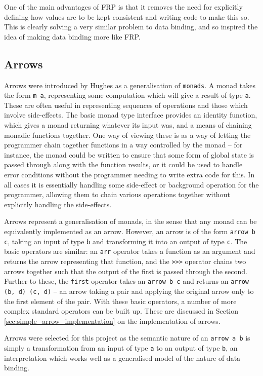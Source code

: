 \documentclass[12pt,twoside,notitlepage]{report}
\begin{document}
One of the main advantages of FRP is that it removes the need for explicitly defining how values are to be kept consistent and writing code to make this so. This is clearly solving a very similar problem to data binding, and so inspired the idea of making data binding more like FRP.

\subsection{Arrows}

Arrows were introduced by Hughes as a generalisation of \texttt{monads}. A monad takes the form \texttt{m a}, representing some computation which will give a result of type \texttt{a}. These are often useful in representing sequences of operations and those which involve side-effects. The basic monad type interface provides an identity function, which gives a monad returning whatever its input was, and a means of chaining monadic functions together. One way of viewing these is as a way of letting the programmer chain together functions in a way controlled by the monad -- for instance, the monad could be written to ensure that some form of global state is passed through along with the function results, or it could be used to handle error conditions without the programmer needing to write extra code for this. In all cases it is essentially handling some side-effect or background operation for the programmer, allowing them to chain various operations together without explicitly handling the side-effects.

Arrows represent a generalisation of monads, in the sense that any monad can be equivalently implemented as an arrow. However, an arrow is of the form \texttt{arrow b c}, taking an input of type \texttt{b} and transforming it into an output of type \texttt{c}. The basic operators are similar: an \texttt{arr} operator takes a function as an argument and returns the arrow representing that function, and the \texttt{>>>} operator chains two arrows together such that the output of the first is passed through the second. Further to these, the \texttt{first} operator takes an \texttt{arrow b c} and returns an \texttt{arrow (b, d) (c, d)} -- an arrow taking a pair and applying the original arrow only to the first element of the pair. With these basic operators, a number of more complex standard operators can be built up. These are discussed in Section \ref{sec:simple_arrow_implementation} on the implementation of arrows.

Arrows were selected for this project as the semantic nature of an \texttt{arrow a b} is simply a transformation from an input of type \texttt{a} to an output of type \texttt{b}, an interpretation which works well as a generalised model of the nature of data binding.
\end{document}
